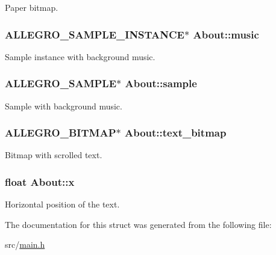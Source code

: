 Paper bitmap. \hypertarget{structAbout_a4c25f6cd85f909dca5325b8825eed16c}{
\subsubsection[{music}]{\setlength{\rightskip}{0pt plus 5cm}A\-L\-L\-E\-G\-R\-O\-\_\-\-S\-A\-M\-P\-L\-E\-\_\-\-I\-N\-S\-T\-A\-N\-C\-E$\ast$ About\-::music}}\label{structAbout_a4c25f6cd85f909dca5325b8825eed16c}
Sample instance with background music. \hypertarget{structAbout_aaae3fb8b349d9973fde2156e1f86c75b}{
\subsubsection[{sample}]{\setlength{\rightskip}{0pt plus 5cm}A\-L\-L\-E\-G\-R\-O\-\_\-\-S\-A\-M\-P\-L\-E$\ast$ About\-::sample}}\label{structAbout_aaae3fb8b349d9973fde2156e1f86c75b}
Sample with background music. \hypertarget{structAbout_a2e5dbd59393791949fd988de7b770f86}{
\subsubsection[{text\-\_\-bitmap}]{\setlength{\rightskip}{0pt plus 5cm}A\-L\-L\-E\-G\-R\-O\-\_\-\-B\-I\-T\-M\-A\-P$\ast$ About\-::text\-\_\-bitmap}}\label{structAbout_a2e5dbd59393791949fd988de7b770f86}
Bitmap with scrolled text. \hypertarget{structAbout_a8ff1ed42ee1abd6ad45def77614015ce}{
\subsubsection[{x}]{\setlength{\rightskip}{0pt plus 5cm}float About\-::x}}\label{structAbout_a8ff1ed42ee1abd6ad45def77614015ce}
Horizontal position of the text. 

The documentation for this struct was generated from the following file\-:\begin{DoxyCompactItemize}
\item 
src/\hyperlink{main_8h}{main.\-h}\end{DoxyCompactItemize}
